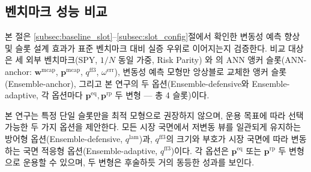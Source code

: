 \documentclass{article}
\begin{document}
\subsection{벤치마크 성능 비교}\label{subsec:benchmark}

본 절은 \ref{subsec:baseline_slot}--\ref{subsec:slot_config}절에서 확인한 변동성 예측 향상 및 슬롯 설계 효과가 표준 벤치마크 대비 실증 우위로 이어지는지 검증한다. 비교 대상은 세 외부 벤치마크(SPY, $1/N$ 동일 가중, Risk Parity) 와 \citet{pyo2018}의 ANN 앵커 슬롯(ANN-anchor: $\mathbf{w}^{\mathrm{mcap}}$, $\mathbf{p}^{\mathrm{mcap}}$, $q^{\mathrm{ff3}}$, $\omega^{\mathrm{err}}$), 변동성 예측 모형만 앙상블로 교체한 앵커 슬롯(Ensemble-anchor), 그리고 본 연구의 두 옵션(Ensemble-defensive와 Ensemble-adaptive, 각 옵션마다 $\mathbf{p}^{\mathrm{eq}}, \mathbf{p}^{\mathrm{rp}}$ 두 변형 — 총 4 슬롯)이다.


본 연구는 특정 단일 슬롯만을 최적 모형으로 권장하지 않으며, 운용 목표에 따라 선택 가능한 두 가지 옵션을 제안한다. 모든 시장 국면에서 저변동 뷰를 일관되게 유지하는 방어형 옵션(Ensemble-defensive, $q^{\mathrm{lam}}$)과, $q^{\mathrm{ff3}}$의 크기와 부호가 시장 국면에 따라 변동하는 국면 적응형 옵션(Ensemble-adaptive, $q^{\mathrm{ff3}}$)이다. 각 옵션은 $\mathbf{p}^{\mathrm{eq}}$ 또는 $\mathbf{p}^{\mathrm{rp}}$ 두 변형으로 운용할 수 있으며, 두 변형은 후술하듯 거의 동등한 성과를 보인다.
\end{document}
